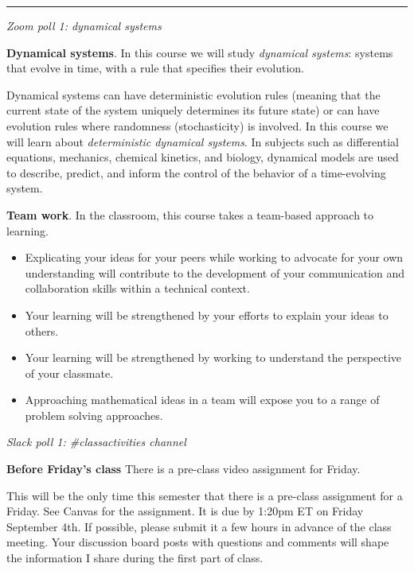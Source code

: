 \documentclass[12pt,letterpaper,noanswers]{exam}
\begin{document}
\vspace{0.2cm}
\hrule
\vspace{0.2cm}


\emph{Zoom poll 1: dynamical systems}

\begin{tcolorbox}
\textbf{Dynamical systems}.  In this course we will study \emph{dynamical systems}: systems that evolve in time, with a rule that specifies their evolution. 
\end{tcolorbox}

 Dynamical systems can have deterministic evolution rules (meaning that the current state of the system uniquely determines its future state) or can have evolution rules where randomness (stochasticity) is involved.  In this course we will learn about \emph{deterministic dynamical systems}.  In subjects such as differential equations, mechanics, chemical kinetics, and biology, dynamical models are used to describe, predict, and inform the control of the behavior of a time-evolving system.

\vspace{1in}

\begin{tcolorbox}
\textbf{Team work}.  In the classroom, this course takes a team-based approach to learning.  
\end{tcolorbox}

\begin{itemize}
    \item Explicating your ideas for your peers while working to advocate for your own understanding will contribute to the development of your communication and collaboration skills within a technical context.
    \item Your learning will be strengthened by your efforts to explain your ideas to others.
    \item Your learning will be strengthened by working to understand the perspective of your classmate.
    \item Approaching mathematical ideas in a team will expose you to a range of problem solving approaches.
\end{itemize}
\emph{Slack poll 1: \#classactivities channel}

\vspace{1in}
  

 

\begin{tcolorbox}
\textbf{Before Friday's class} There is a pre-class video assignment for Friday.
\end{tcolorbox}
This will be the only time this semester that there is a pre-class assignment for a Friday.  See Canvas for the assignment.  It is due by 1:20pm ET on Friday September 4th.  If possible, please submit it a few hours in advance of the class meeting.  Your discussion board posts with questions and comments will shape the information I share during the first part of class.
\end{document}
